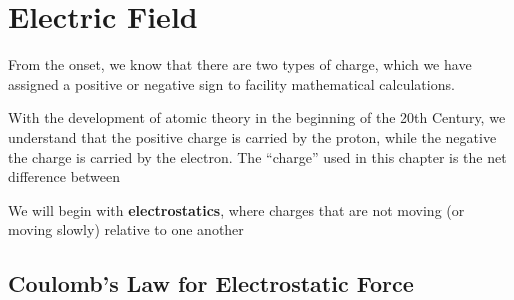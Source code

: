 \chapter{Electric Field}


From the onset, we know that there are two types of charge, which we have
assigned a positive or negative sign to facility mathematical calculations.

With the development of atomic theory in the beginning of the 20th Century,
we understand that the positive charge is carried by the proton, while the
negative the charge is carried by the electron. The ``charge'' used in this
chapter is the net difference between 


We will begin with \textbf{electrostatics}, where charges that are not moving
(or moving slowly) relative to one another



\section{Coulomb's Law for Electrostatic Force}

